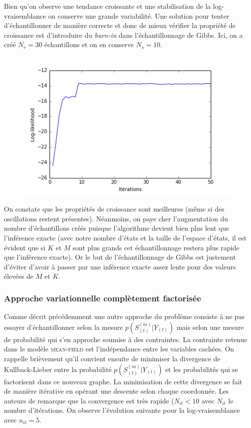 \documentclass[10pt,a4paper]{article}
\newcommand{\meanfield}{\textsc{mean-field}}
\begin{document}
  Bien qu'on observe une tendance croissante et une stabilisation de la 
log-vraisemblance on conserve une grande variabilité.
Une solution pour tenter d'échantillonner de manière correcte et donc de mieux
vérifier la propriété de croissance est d'introduire du \textit{burn-in} dans
l'échantillonnage de Gibbs.
Ici, on a créé $N_r = 30$ échantillons et on en conserve $N_s = 10$.

\begin{figure}[H]
\centering
\includegraphics[scale=0.5]{../resources/pictures/M3_K2_gibbs.png}
\end{figure}
On constate que les propriétés de croissance sont meilleures (même si des 
oscillations restent présentes). Néanmoins, on paye cher l'augmentation du 
nombre d'échantillons créés puisque l'algorithme devient bien plus lent que 
l'inférence exacte (avec notre nombre d'états et la taille de l'espace d'états, 
il est évident que si $K$ et $M$ sont plus grands cet échantillonnage restera 
plus rapide que l'inférence exacte). Or le but de l'échantillonnage de Gibbs 
est justement d'éviter d'avoir à passer par une inférence exacte assez lente 
pour des valeurs élevées de $M$ et $K$.
\subsubsection{Approche variationnelle complètement factorisée}
Comme décrit précédemment une autre approche du problème consiste à ne pas 
essayer d'échantillonner selon la mesure $p(S_{(t)}^{(m)} \vert Y_{(t)})$ mais 
selon une mesure de probabilité qui s'en approche soumise à des contraintes. La 
contrainte retenue dans le modèle \meanfield{} est l'indépendance entre les 
variables cachées. On rappelle brièvement qu'il convient ensuite de minimiser 
la divergence de Kullback-Lieber entre la probabilité $p(S_{(t)}^{(m)} \vert 
Y_{(t)})$ et les probabilités qui se factorisent dans ce nouveau graphe. La 
minimisation de cette divergence se fait de manière itérative en opérant une 
descente selon chaque coordonnée. Les auteurs de \cite{ghahramani1997factorial} 
remarque que la convergence est très rapide ($N_{it}< 10$ avec $N_{it}$ le 
nombre d'itérations. On observe l'évolution suivante pour la log-vraisemblance 
avec $n_{it} = 5$.
\end{document}
